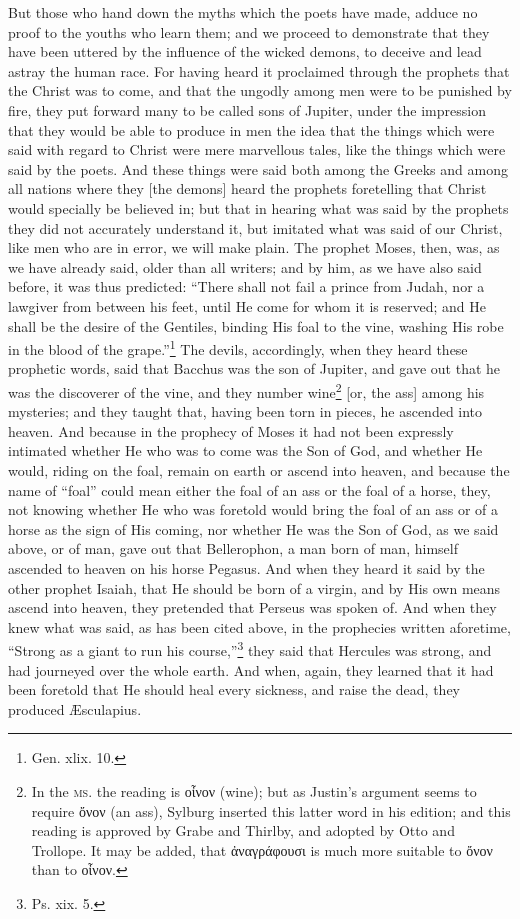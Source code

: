 
But those who hand down the myths which the poets have made, adduce no proof to the youths who learn them; and we proceed to demonstrate that they have been uttered by the influence of the wicked demons, to deceive and lead astray the human race. For having heard it proclaimed through the prophets that the Christ was to come, and that the ungodly among men were to be punished by fire, they put forward many to be called sons of Jupiter, under the impression that they would be able to produce in men the idea that the things which were said with regard to Christ were mere marvellous tales, like the things which were said by the poets. And these things were said both among the Greeks and among all nations where they [the demons] heard the prophets foretelling that Christ would specially be believed in; but that in hearing what was said by the prophets they did not accurately understand it, but imitated what was said of our Christ, like men who are in error, we will make plain. The prophet Moses, then, was, as we have already said, older than all writers; and by him, as we have also said before, it was thus predicted: “There shall not fail a prince from Judah, nor a lawgiver from between his feet, until He come for whom it is reserved; and He shall be the desire of the Gentiles, binding His foal to the vine, washing His robe in the blood of the grape.”\footnote{Gen. xlix. 10.} The devils, accordingly, when they heard these prophetic words, said that Bacchus was the son of Jupiter, and gave out that he was the discoverer of the vine, and they number wine\footnote{In the \textsc{ms.} the reading is \textgreek{οἶνον} (wine); but as Justin’s argument seems to require \textgreek{ὄνον} (an ass), Sylburg inserted this latter word in his edition; and this reading is approved by Grabe and Thirlby, and adopted by Otto and Trollope. It may be added, that \textgreek{ἀναγράφουσι} is much more suitable to \textgreek{ὄνον} than to \textgreek{οἶνον}.} [or, the ass] among his mysteries; and they taught that, having been torn in pieces, he ascended into heaven. And because in the prophecy of Moses it had not been expressly intimated whether He who was to come was the Son of God, and whether He would, riding on the foal, remain on earth or ascend into heaven, and because the name of “foal” could mean either the foal of an ass or the foal of a horse, they, not knowing whether He who was foretold would bring the foal of an ass or of a horse as the sign of His coming, nor whether He was the Son of God, as we said above, or of man, gave out that Bellerophon, a man born of man, himself ascended to heaven on his horse Pegasus. And when they heard it said by the other prophet Isaiah, that He should be born of a virgin, and by His own means ascend into heaven, they pretended that Perseus was spoken of. And when they knew what was said, as has been cited above, in the prophecies written aforetime, “Strong as a giant to run his course,”\footnote{Ps. xix. 5.} they said that Hercules was strong, and had journeyed over the whole earth. And when, again, they learned that it had been foretold that He should heal every sickness, and raise the dead, they produced Æsculapius.

